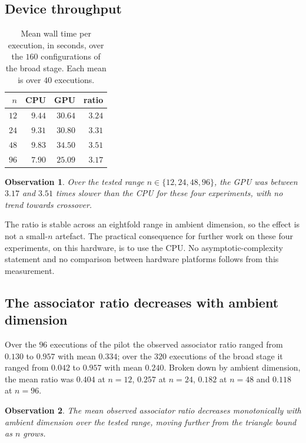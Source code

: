 \documentclass[11pt]{amsart}
\newtheorem{observation}{Observation}[section]
\theoremstyle{remark}
\begin{document}
\subsection{Device throughput}

\begin{table}[h]
\centering\small
\caption{Mean wall time per execution, in seconds, over the $160$ configurations of the
broad stage. Each mean is over $40$ executions.}
\label{tab:throughput}
\begin{tabular}{@{}rrrr@{}}
\toprule
$n$ & CPU & GPU & ratio \\
\midrule
$12$ & $9.44$ & $30.64$ & $3.24$ \\
$24$ & $9.31$ & $30.80$ & $3.31$ \\
$48$ & $9.83$ & $34.50$ & $3.51$ \\
$96$ & $7.90$ & $25.09$ & $3.17$ \\
\bottomrule
\end{tabular}
\end{table}

\begin{observation}
\label{obs:throughput}
Over the tested range $n\in\{12,24,48,96\}$, the GPU was between $3.17$ and $3.51$ times
slower than the CPU for these four experiments, with no trend towards crossover.
\end{observation}

The ratio is stable across an eightfold range in ambient dimension, so the effect is not a
small-$n$ artefact. The practical consequence for further work on these four experiments,
on this hardware, is to use the CPU. No asymptotic-complexity statement and no comparison
between hardware platforms follows from this measurement.

\subsection{The associator ratio decreases with ambient dimension}

Over the $96$ executions of the pilot the observed associator ratio ranged from $0.130$ to
$0.957$ with mean $0.334$; over the $320$ executions of the broad stage it ranged from
$0.042$ to $0.957$ with mean $0.240$. Broken down by ambient dimension, the mean ratio was
$0.404$ at $n=12$, $0.257$ at $n=24$, $0.182$ at $n=48$ and $0.118$ at $n=96$.

\begin{observation}
\label{obs:associatortrend}
The mean observed associator ratio decreases monotonically with ambient dimension over the
tested range, moving further from the triangle bound as $n$ grows.
\end{observation}
\end{document}
